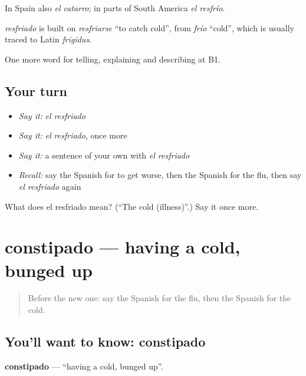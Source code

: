 In Spain also \emph{el catarro}; in parts of South America \emph{el resfrío}.

\begin{cousinweb}
\emph{resfriado} is built on \emph{resfriarse} \textquotedblleft{}to catch cold\textquotedblright{}, from \emph{frío} \textquotedblleft{}cold\textquotedblright{}, which is usually traced to Latin \emph{frīgidus}.
\end{cousinweb}

\begin{grammarlens}[title={What you've built}]
One more word for telling, explaining and describing at B1.
\end{grammarlens}

\subsection*{Your turn}
\begin{itemize}
\raggedright
  \item \emph{Say it:} \emph{el resfriado}
  \item \emph{Say it:} \emph{el resfriado}, once more
  \item \emph{Say it:} a sentence of your own with \emph{el resfriado}
  \item \emph{Recall:} say the Spanish for to get worse, then the Spanish for the flu, then say \emph{el resfriado} again
\end{itemize}

\begin{tcolorbox}[breakable,colback=teal!4,colframe=teal!35!black,title={Before you move on}]
What does el resfriado mean? (\textquotedblleft{}The cold (illness)\textquotedblright{}.) Say it once more.
\end{tcolorbox}
\section[constipado]{constipado — having a cold, bunged up}

\label{lesson:ES-C733-constipado}



\begin{quote}
Before the new one: say the Spanish for the flu, then the Spanish for the cold.
\end{quote}

\subsection*{You'll want to know: constipado}
\textbf{constipado} — \textquotedblleft{}having a cold, bunged up\textquotedblright{}.

